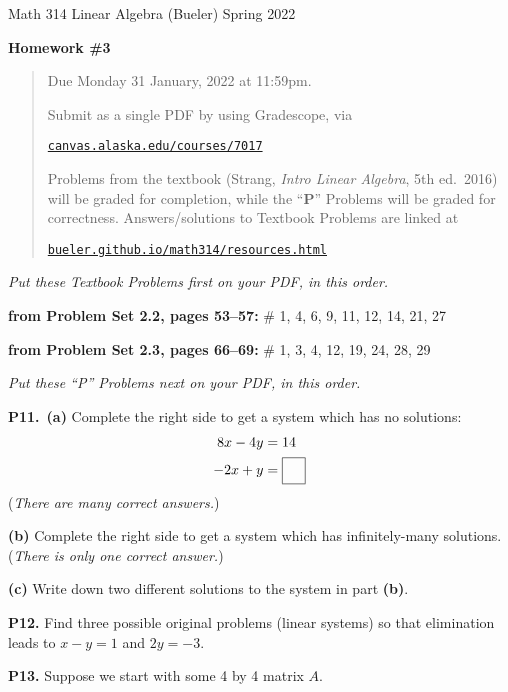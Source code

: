 \documentclass[12pt]{amsart}
\newcommand{\prob}[1]{\bigskip\noindent\textbf{#1}\quad }
\newcommand{\probset}[2]{\prob{from Problem Set #1, pages #2:}}
\newcommand{\epart}[1]{\medskip\noindent\textbf{(#1)}\quad }
\newcommand{\ppart}[1]{\,\textbf{(#1)}\quad }
\begin{document}
\scriptsize \noindent Math 314 Linear Algebra (Bueler) \hfill Spring 2022
\normalsize\medskip

\Large
\centerline{\textbf{Homework \#3}}

\normalsize
\bigskip
\begin{quote}
Due Monday 31 January, 2022 at 11:59pm.

\medskip
\noindent Submit as a single PDF by using Gradescope, via

\href{https://canvas.alaska.edu/courses/7017}{\texttt{canvas.alaska.edu/courses/7017}}

\noindent Problems from the textbook (Strang, \emph{Intro Linear Algebra}, 5th ed.~2016) will be graded for completion, while the ``\textbf{P}'' Problems will be graded for correctness.  Answers/solutions to Textbook Problems are linked at

\href{https://bueler.github.io/math314/resources.html}{\texttt{bueler.github.io/math314/resources.html}}
\end{quote}
\medskip

\thispagestyle{empty}

\noindent \hrulefill

\noindent \emph{Put these Textbook Problems first on your PDF, in this order.}

\probset{2.2}{53--57} \# 1, 4, 6, 9, 11, 12, 14, 21, 27

\probset{2.3}{66--69} \# 1, 3, 4, 12, 19, 24, 28, 29


\bigskip
\noindent \hrulefill

\noindent \emph{Put these ``P'' Problems next on your PDF, in this order.}

\prob{P11.}  \ppart{a} Complete the right side to get a system which has no solutions:
\begin{align*}
8 x - 4 y &= 14 \\
-2 x + y &= \fbox{\strut \quad}
\end{align*}
(\emph{There are many correct answers.})

\epart{b} Complete the right side to get a system which has infinitely-many solutions.  (\emph{There is only one correct answer.})

\epart{c} Write down two different solutions to the system in part \textbf{(b)}.

\prob{P12.}  Find three possible original problems (linear systems) so that elimination leads to $x-y=1$ and $2y = -3$.

\prob{P13.}  Suppose we start with some 4 by 4 matrix $A$.
\end{document}
